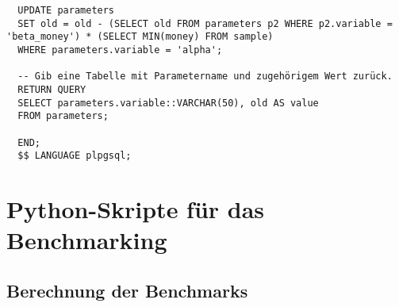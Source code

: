 \begin{verbatim}
  UPDATE parameters
  SET old = old - (SELECT old FROM parameters p2 WHERE p2.variable = 'beta_money') * (SELECT MIN(money) FROM sample)
  WHERE parameters.variable = 'alpha';

  -- Gib eine Tabelle mit Parametername und zugehörigem Wert zurück.
  RETURN QUERY
  SELECT parameters.variable::VARCHAR(50), old AS value
  FROM parameters;

  END;
  $$ LANGUAGE plpgsql;
\end{verbatim}

\chapter{Python-Skripte für das Benchmarking}
\label{appendix:F}

\section{Berechnung der Benchmarks}
\label{appendix:F:1}

